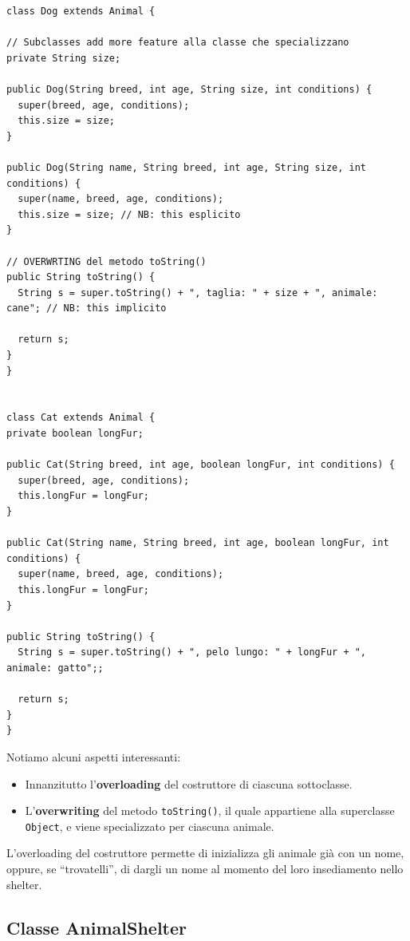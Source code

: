 \documentclass[a4paper,11pt]{article}
\begin{document}
\begin{lstlisting}[caption={Aniaml.java -- Estensione della classe {\tt Animal} per definire nuove specie.}]
class Dog extends Animal {

// Subclasses add more feature alla classe che specializzano
private String size;

public Dog(String breed, int age, String size, int conditions) {
  super(breed, age, conditions);
  this.size = size;
}

public Dog(String name, String breed, int age, String size, int conditions) {
  super(name, breed, age, conditions);
  this.size = size; // NB: this esplicito
}

// OVERWRTING del metodo toString()
public String toString() {
  String s = super.toString() + ", taglia: " + size + ", animale: cane"; // NB: this implicito

  return s;
}
}


class Cat extends Animal {
private boolean longFur;

public Cat(String breed, int age, boolean longFur, int conditions) {
  super(breed, age, conditions);
  this.longFur = longFur;
}

public Cat(String name, String breed, int age, boolean longFur, int conditions) {
  super(name, breed, age, conditions);
  this.longFur = longFur;
}

public String toString() {
  String s = super.toString() + ", pelo lungo: " + longFur + ", animale: gatto";;

  return s;
}
}

\end{lstlisting}

Notiamo alcuni aspetti interessanti:
\begin{itemize}
    \item Innanzitutto l'\textbf{overloading} del costruttore di ciascuna sottoclasse.
    \item L'\textbf{overwriting} del metodo {\tt toString()}, il quale appartiene alla superclasse {\tt Object}, e viene specializzato per ciascuna animale.
\end{itemize}

L'overloading del costruttore permette di inizializza gli animale già con un nome, oppure, se ``trovatelli'', di dargli un nome al momento del loro insediamento nello shelter.


\subsection{Classe AnimalShelter}
\end{document}
